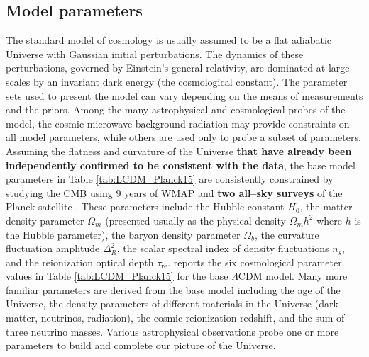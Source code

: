 \documentclass[paper=a4, fontsize=11pt]{scrartcl} %
\numberwithin{equation}{section} %
\numberwithin{figure}{section} %
\numberwithin{table}{section} %
\begin{document}

\subsection{Model parameters}
\label{subsec:Model_parameters}
The standard model of cosmology is usually assumed to be a flat adiabatic Universe with Gaussian initial perturbations.  The dynamics of these perturbations, governed by Einstein's general relativity, are dominated at large scales by an invariant dark energy (the cosmological constant). The parameter sets used to present the model can vary depending on the means of measurements and the priors. Among the many astrophysical and cosmological probes of the model, the cosmic microwave background radiation may provide constraints on all model parameters, while others are used only to probe a subset of parameters. Assuming the flatness and curvature of the Universe {\bf that have already been independently confirmed to be consistent with the data}, the base model parameters in %
Table \ref{tab:LCDM_Planck15} are consistently constrained by studying the CMB using 9 years of WMAP \citep[][]{WMAP9} and {\bf two all--sky surveys} of the Planck satellite \citep[][]{Planck2015}. These parameters include the Hubble constant $H_0$, the matter density parameter $\Omega_m$ (presented usually as the physical density $\Omega_m h^2$ where $h$ is the Hubble parameter), the baryon density parameter $\Omega_b$, the curvature fluctuation amplitude $\Delta^2_R$, the scalar spectral index of density fluctuations $n_s$, and the reionization optical depth $\tau_\mathrm{re}$. \citet[][]{Planck2015} reports the six cosmological parameter values in Table \ref{tab:LCDM_Planck15} for the base $\Lambda$CDM model. Many more familiar parameters are derived from the base model including the age of the Universe, the density parameters of different materials in the Universe (dark matter, neutrinos, radiation), the cosmic reionization redshift, and the sum of three neutrino masses. Various astrophysical observations probe one or more parameters to build and complete our picture of the Universe.
\end{document}
